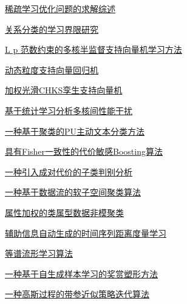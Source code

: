 \documentclass[a4paper]{article}
\begin{document}
\href{http://www.jos.org.cn/ch/reader/download_pdf.aspx?file_no=4479&year_id=2013&quarter_id=11&falg=1}{稀疏学习优化问题的求解综述}

\href{http://www.jos.org.cn/ch/reader/download_pdf.aspx?file_no=4468&year_id=2013&quarter_id=11&falg=1}{关系分类的学习界限研究}

\href{http://www.jos.org.cn/ch/reader/download_pdf.aspx?file_no=4483&year_id=2013&quarter_id=11&falg=1}{L p 范数约束的多核半监督支持向量机学习方法}

\href{http://www.jos.org.cn/ch/reader/download_pdf.aspx?file_no=4472&year_id=2013&quarter_id=11&falg=1}{动态粒度支持向量回归机}

\href{http://www.jos.org.cn/ch/reader/download_pdf.aspx?file_no=4475&year_id=2013&quarter_id=11&falg=1}{加权光滑CHKS孪生支持向量机}

\href{http://www.jos.org.cn/ch/reader/download_pdf.aspx?file_no=4482&year_id=2013&quarter_id=11&falg=1}{基于统计学习分析多核间性能干扰}

\href{http://www.jos.org.cn/ch/reader/download_pdf.aspx?file_no=4467&year_id=2013&quarter_id=11&falg=1}{一种基于聚类的PU主动文本分类方法}

\href{http://www.jos.org.cn/ch/reader/download_pdf.aspx?file_no=4485&year_id=2013&quarter_id=11&falg=1}{具有Fisher一致性的代价敏感Boosting算法}

\href{http://www.jos.org.cn/ch/reader/download_pdf.aspx?file_no=4473&year_id=2013&quarter_id=11&falg=1}{一种引入成对代价的子类判别分析}

\href{http://www.jos.org.cn/ch/reader/download_pdf.aspx?file_no=4469&year_id=2013&quarter_id=11&falg=1}{一种基于数据流的软子空间聚类算法}

\href{http://www.jos.org.cn/ch/reader/download_pdf.aspx?file_no=4470&year_id=2013&quarter_id=11&falg=1}{属性加权的类属型数据非模聚类}

\href{http://www.jos.org.cn/ch/reader/download_pdf.aspx?file_no=4464&year_id=2013&quarter_id=11&falg=1}{辅助信息自动生成的时间序列距离度量学习}

\href{http://www.jos.org.cn/ch/reader/download_pdf.aspx?file_no=4465&year_id=2013&quarter_id=11&falg=1}{等谱流形学习算法}

\href{http://www.jos.org.cn/ch/reader/download_pdf.aspx?file_no=4471&year_id=2013&quarter_id=11&falg=1}{一种基于自生成样本学习的奖赏塑形方法}

\href{http://www.jos.org.cn/ch/reader/download_pdf.aspx?file_no=4466&year_id=2013&quarter_id=11&falg=1}{一种高斯过程的带参近似策略迭代算法}
\end{document}
